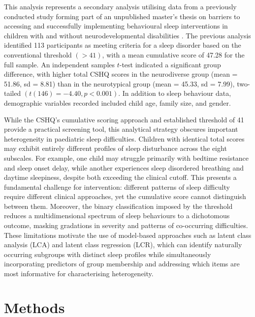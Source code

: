 \documentclass[11pt]{article}
\theoremstyle{plain}
\theoremstyle{definition}
\begin{document}
This analysis represents a secondary analysis utilising data from a previously conducted study forming part of an unpublished master’s thesis on barriers to accessing and successfully implementing behavioural sleep interventions in children with and without neurodevelopmental disabilities \citep{walsh_exploring_2022}. The previous analysis identified 113 participants as meeting criteria for a sleep disorder based on the conventional threshold $(>41)$, with a mean cumulative score of 47.28 for the full sample. An independent samples $t$-test indicated a significant group difference, with higher total CSHQ scores in the neurodiverse group (mean = 51.86, sd = 8.81) than in the neurotypical group (mean = 45.33, sd = 7.99), two-tailed $(t(146) = -4.40, p < 0.001)$. In addition to sleep behaviour data, demographic variables recorded included child age, family size, and gender.

While the CSHQ's cumulative scoring approach and established threshold of 41 provide a practical screening tool, this analytical strategy obscures important heterogeneity in paediatric sleep difficulties. Children with identical total scores may exhibit entirely different profiles of sleep disturbance across the eight subscales. For example, one child may struggle primarily with bedtime resistance and sleep onset delay, while another experiences sleep disordered breathing and daytime sleepiness, despite both exceeding the clinical cutoff. This presents a fundamental challenge for intervention: different patterns of sleep difficulty require different clinical approaches, yet the cumulative score cannot distinguish between them. Moreover, the binary classification imposed by the threshold reduces a multidimensional spectrum of sleep behaviours to a dichotomous outcome, masking gradations in severity and patterns of co-occurring difficulties. These limitations motivate the use of model-based approaches such as latent class analysis (LCA) and latent class regression (LCR), which can identify naturally occurring subgroups with distinct sleep profiles while simultaneously incorporating predictors of group membership and addressing which items are most informative for characterising heterogeneity.

\section{Methods}
\end{document}
